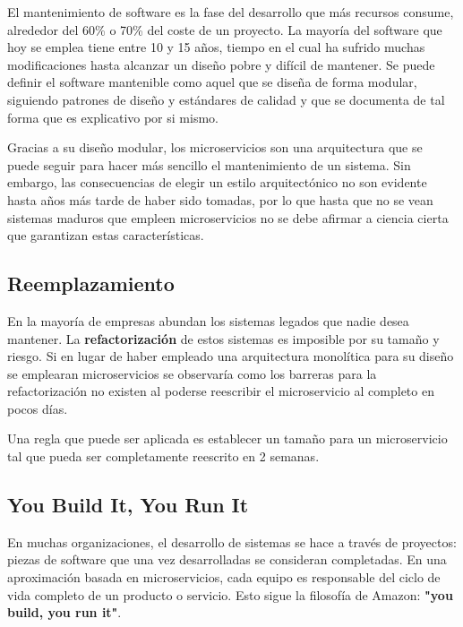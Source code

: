 \documentclass[11pt,spanish,listoffigures]{tfgetsinf}
\begin{document}
El mantenimiento de software es la fase del desarrollo que más recursos consume, alrededor del 60\% o 70\% del coste de un proyecto. La mayoría del software que hoy se emplea tiene entre 10 y 15 años, tiempo en el cual ha sufrido muchas modificaciones hasta alcanzar un diseño pobre y difícil de mantener. Se puede definir el software mantenible como aquel que se diseña de forma modular, siguiendo patrones de diseño y estándares de calidad y que se documenta de tal forma que es explicativo por si mismo. \cite{Pressman} 

Gracias a su diseño modular, los microservicios son una arquitectura que se puede seguir para hacer más sencillo el mantenimiento de un sistema. Sin embargo, las consecuencias de elegir un estilo arquitectónico no son evidente hasta años más tarde de haber sido tomadas, por lo que hasta que no se vean sistemas maduros que empleen microservicios no se debe afirmar a ciencia cierta que garantizan estas características. \cite{Lewis2014}

\subsection{Reemplazamiento}


En la mayoría de empresas abundan los sistemas legados que nadie desea mantener. La \textbf{refactorización} de estos sistemas es imposible por su tamaño y riesgo. Si en lugar de haber empleado una arquitectura monolítica para su diseño se emplearan microservicios se observaría como los barreras para la refactorización no existen al poderse reescribir el microservicio al completo en pocos días.

Una regla que puede ser aplicada es establecer un tamaño para un microservicio tal que pueda ser completamente reescrito en 2 semanas. \cite{Newman2015a}

\subsection{You Build It, You Run It}

En muchas organizaciones, el desarrollo de sistemas se hace a través de proyectos: piezas de software que una vez desarrolladas se consideran completadas. En una aproximación basada en microservicios, cada equipo es responsable del ciclo de vida completo de un producto o servicio. Esto sigue la filosofía de Amazon: \textbf{"you build, you run it"}. \cite{Lewis2014}
\end{document}
